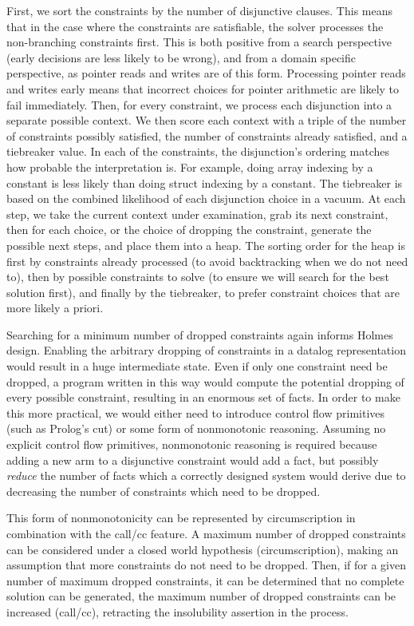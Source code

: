 First, we sort the constraints by the number of disjunctive clauses. This means that in the case where the constraints are satisfiable, the solver processes the non-branching constraints first. This is both positive from a search perspective (early decisions are less likely to be wrong), and from a domain specific perspective, as pointer reads and writes are of this form. Processing pointer reads and writes early means that incorrect choices for pointer arithmetic are likely to fail immediately.
Then, for every constraint, we process each disjunction into a separate possible context. We then score each context with a triple of the number of constraints possibly satisfied, the number of constraints already satisfied, and a tiebreaker value.
In each of the constraints, the disjunction's ordering matches how probable the interpretation is. For example, doing array indexing by a constant is less likely than doing struct indexing by a constant. The tiebreaker is based on the combined likelihood of each disjunction choice in a vacuum. At each step, we take the current context under examination, grab its next constraint, then for each choice, or the choice of dropping the constraint, generate the possible next steps, and place them into a heap. The sorting order for the heap is first by constraints already processed (to avoid backtracking when we do not need to), then by possible constraints to solve (to ensure we will search for the best solution first), and finally by the tiebreaker, to prefer constraint choices that are more likely a priori.

Searching for a minimum number of dropped constraints again informs Holmes design.
Enabling the arbitrary dropping of constraints in a datalog representation would result in a huge intermediate state.
Even if only one constraint need be dropped, a program written in this way would compute the potential dropping of every possible constraint, resulting in an enormous set of facts.
In order to make this more practical, we would either need to introduce control flow primitives (such as Prolog's cut) or some form of nonmonotonic reasoning.
Assuming no explicit control flow primitives, nonmonotonic reasoning is required because adding a new arm to a disjunctive constraint would add a fact, but possibly \emph{reduce} the number of facts which a correctly designed system would derive due to decreasing the number of constraints which need to be dropped.

This form of nonmonotonicity can be represented by circumscription in combination with the call/cc feature.
A maximum number of dropped constraints can be considered under a closed world hypothesis (circumscription), making an assumption that more constraints do not need to be dropped.
Then, if for a given number of maximum dropped constraints, it can be determined that no complete solution can be generated, the maximum number of dropped constraints can be increased (call/cc), retracting the insolubility assertion in the process.

